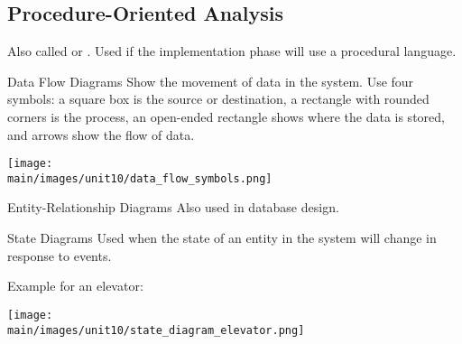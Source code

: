 \documentclass[\main/notes.tex]{subfiles}
\begin{document}
			\subsection{Procedure-Oriented Analysis}
				Also called  or . Used if the implementation phase will use a procedural language.
				\begin{definition}{Data Flow Diagrams}
					Show the movement of data in the system. Use four symbols: a square box is the source or destination, a rectangle with rounded corners is the process, an open-ended rectangle shows where the data is stored, and arrows show the flow of data.
					\begin{center}
						\texttt{[image: \\main/images/unit10/data\_flow\_symbols.png]}
					\end{center}
				\end{definition}
				\begin{definition}{Entity-Relationship Diagrams}
					Also used in database design.
				\end{definition}
				\begin{definition}{State Diagrams}
					Used when the state of an entity in the system will change in response to events.

					Example for an elevator:
					\begin{center}
						\texttt{[image: \\main/images/unit10/state\_diagram\_elevator.png]}
					\end{center}
				\end{definition}
			\pagebreak
\end{document}
